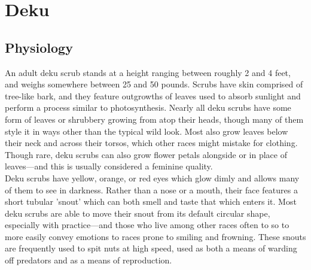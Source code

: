 \documentclass[10pt,twoside,twocolumn,openany]{book}
\begin{document}
\newpage
\section{Deku}
\subsection{Physiology}
An adult deku scrub stands at a height ranging between roughly 2 and 4 feet, and weighs somewhere between 25 and 50 pounds. Scrubs have skin comprised of tree-like bark, and they feature outgrowths of leaves used to absorb sunlight and perform a process similar to photosynthesis. Nearly all deku scrubs have some form of leaves or shrubbery growing from atop their heads, though many of them style it in ways other than the typical wild look. Most also grow leaves below their neck and across their torsos, which other races might mistake for clothing. Though rare, deku scrubs can also grow flower petals alongside or in place of leaves—and this is usually considered a feminine quality.\\
Deku scrubs have yellow, orange, or red eyes which glow dimly and allows many of them to see in darkness. Rather than a nose or a mouth, their face features a short tubular 'snout' which can both smell and taste that which enters it. Most deku scrubs are able to move their snout from its default circular shape, especially with practice—and those who live among other races often to so to more easily convey emotions to races prone to smiling and frowning. These snouts are frequently used to spit nuts at high speed, used as both a means of warding off predators and as a means of reproduction.\\
\end{document}
